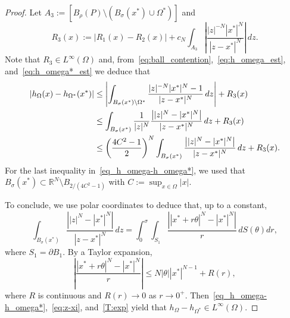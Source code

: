\documentclass[11pt]{article}
\newcommand{\R}{\mathbb{R}}
\numberwithin{equation}{section}
\begin{document}
\begin{proof}
Let $A_3 := [B_\rho(P) \setminus (B_\sigma(x^*) \cup \Omega^*)]$ and 
\begin{equation*}
    R_3(x) := |R_1(x) - R_2(x)|+ c_N \int_{A_3} \left| \frac{|z|^{-N}|x^*|^N}{|z-x^*|^N} \right| \, dz.
\end{equation*}
Note that $R_3\in L^\infty(\Omega)$ and, from~\eqref{eq:ball_contention},~\eqref{eq:h_omega_est}, and~\eqref{eq:h_omega*_est} we deduce that
\begin{align}
        |h_\Omega(x)-h_{\Omega^*}(x^*)| 
        &\le \left|\int_{B_\sigma(x^*) \setminus \Omega^*} \frac{|z|^{-N}|x^*|^N-1}{|z-x^*|^N} \, dz \right|+ R_3(x) \notag\\
        &\le \int_{B_\sigma(x^*)} \frac{1}{|z|^N} \frac{\left| |z|^N-|x^*|^N \right|}{|z-x^*|^N} \, dz + R_3(x) \notag\\
        &\le \left( \frac{4C^2-1}{2} \right)^N \int_{B_\sigma(x^*)} \frac{\left| |z|^N-|x^*|^N \right|}{|z-x^*|^N} \, dz + R_3(x).\label{eq_h_omega-h_omega*}
\end{align}
For the last inequality in~\eqref{eq_h_omega-h_omega*}, we used that $B_\sigma(x^*) \subset \R^N \setminus B_{2/(4C^2-1)}$ with $C := \sup_{x \in \Omega} |x|$.

To conclude, we use polar coordinates to deduce that, up to a constant,
\begin{equation} \label{eq:z-xi}
    \int_{B_\sigma(x^*)} \frac{\left| |z|^N-|x^*|^N \right|}{|z-x^*|^N} \, dz = \int_0^\sigma \int_{S_1} \frac{\left| |x^*+r\theta|^N-|x^*|^N \right|}{r} \, dS(\theta) dr,
\end{equation}
where $S_1 = \partial B_1$. By a Taylor expansion,
\begin{equation}\label{T:exp}
    \left|\frac{|x^*+r\theta|^N-|x^*|^N}{r}\right|\leq N |\theta||x^*|^{N-1} + R(r),
\end{equation}
where $R$ is continuous and $R(r) \to 0$ as $r \to 0^+$. Then~\eqref{eq_h_omega-h_omega*},~\eqref{eq:z-xi}, and~\eqref{T:exp} yield that $h_\Omega - h_{\Omega^*} \in L^\infty(\Omega)$.
\end{proof}
\end{document}
